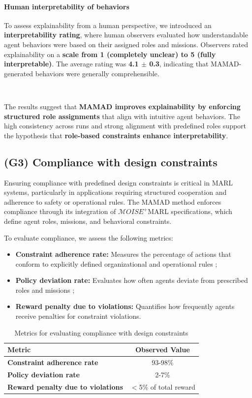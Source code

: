 \documentclass[pdflatex,sn-mathphys-num]{sn-jnl}%
\theoremstyle{thmstyleone}%
\theoremstyle{thmstyletwo}%
\theoremstyle{thmstylethree}%
\begin{document}
\paragraph{Human interpretability of behaviors}
To assess explainability from a human perspective, we introduced an \textbf{interpretability rating}, where human observers evaluated how understandable agent behaviors were based on their assigned roles and missions. Observers rated explainability on a \textbf{scale from 1 (completely unclear) to 5 (fully interpretable)}. The average rating was \textbf{4.1 $\pm$ 0.3}, indicating that MAMAD-generated behaviors were generally comprehensible.

\

The results suggest that \textbf{MAMAD improves explainability by enforcing structured role assignments} that align with intuitive agent behaviors. The high consistency across runs and strong alignment with predefined roles support the hypothesis that \textbf{role-based constraints enhance interpretability}.


\subsection{(G3) Compliance with design constraints}

Ensuring compliance with predefined design constraints is critical in MARL systems, particularly in applications requiring structured cooperation and adherence to safety or operational rules. The MAMAD method enforces compliance through its integration of $\mathcal{M}OISE^+$MARL specifications, which define agent roles, missions, and behavioral constraints. 

To evaluate compliance, we assess the following metrics:

\begin{itemize}
    \item \textbf{Constraint adherence rate:} Measures the percentage of actions that conform to explicitly defined organizational and operational rules ;
    \item \textbf{Policy deviation rate:} Evaluates how often agents deviate from prescribed roles and missions ;
    \item \textbf{Reward penalty due to violations:} Quantifies how frequently agents receive penalties for constraint violations.
\end{itemize}

\begin{table}[h!]
    \centering
    \caption{Metrics for evaluating compliance with design constraints}
    \begin{tabular}{|l|c|}
        \hline
        \textbf{Metric} & \textbf{Observed Value} \\
        \hline
        \textbf{Constraint adherence rate} & 93-98\% \\
        \hline
        \textbf{Policy deviation rate} & 2-7\% \\
        \hline
        \textbf{Reward penalty due to violations} & $<$5\% of total reward \\
        \hline
    \end{tabular}
    \label{tab:compliance}
\end{table}
\end{document}
